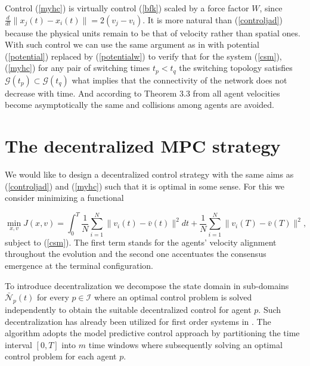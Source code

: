 \documentclass[a4paper,10pt, english]{article}
\begin{document}
Control (\ref{myhc}) is virtually control (\ref{bfk})  scaled by a force factor $W$, since $\frac{d}{dt}\|x_j(t) - x_i(t)\| = 2(v_j - v_i)$. It is more natural than (\ref{controljad}) because the physical 
units remain to be that of velocity rather than spatial ones. With such control we can use the same argument as in \cite{jfwpc} with potential (\ref{potential}) replaced by (\ref{potentialw})  to verify that for the system (\ref{csm}), (\ref{myhc})  
for any pair of switching times $t_p < t_q$ the switching topology satisfies $\mathcal{G}(t_p) \subset \mathcal{G}(t_q)$ what implies that the connectivity of the network does not decrease with time.
And according to Theorem 3.3 from \cite{jfwpc} all agent velocities become asymptotically the same and collisions among agents are avoided. 






\section{The decentralized MPC strategy}
  We would like to design a decentralized control strategy with the same aims as (\ref{controljad}) and (\ref{myhc}) such that it is optimal in some sense. For this we consider minimizing a functional 
 
  \begin{equation}
  \min_{x, v} J(x, v) = \int_{0}^{T}\frac{1}{N}\sum_{i=1}^{N}\|v_i(t) - \bar{v}(t)\|^2 dt + \frac{1}{N}\sum_{i=1}^{N}\|v_i(T) - \bar{v}(T)\|^2,
 \label{j}
 \end{equation}
 subject to (\ref{csm}). The first term stands for the agents' velocity alignment throughout the evolution and the second one accentuates the consensus emergence at the terminal configuration. 
 
 To introduce decentralization we decompose the state domain in sub-domains $\bar{\mathcal{N}}_p(t)$ for every $p\in \mathcal{I}$ where an optimal control problem is solved independently to obtain the suitable decentralized control for agent $p$. Such decentralization has already been utilized for first order systems in \cite{jdccms}.
 The algorithm adopts the model predictive control approach by partitioning the time interval $[0, T]$ into $m$ time windows where subsequently solving an optimal control problem for each agent $p$.
 
\end{document}
